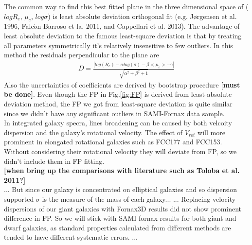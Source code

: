 \documentclass{aa}
\begin{document}
The common way to find this best fitted plane in the three dimensional space of ($logR_e$, $\mu_e$, $log\sigma$) is least absolute deviation orthogonal fit (e.g. J\o rgensen et al. 1996, Falc$\acute{o}$n-Barroso et la. 2011, and Cappellari et al. 2013). The advantage of least absolute deviation to the famous least-square deviation is that by treating all parameters symmetrically it's relatively insensitive to few outliers. In this method the residuals perpendicular to the plane are 
\begin{eqnarray}
	D = \frac{| log(R_e)-\alpha log(\sigma)-\beta <\mu_e>-\gamma |}{\sqrt{\alpha^2+\beta^2+1}}
\end{eqnarray}
Also the uncertainties of coefficients are derived by bootstrap procedure \textbf{[must be done]}. Even though the FP in Fig.\ref{fig:FP} is derived from least-absolute deviation method, the FP we got from least-square deviation is quite similar since we didn't have any significant outliers in SAMI-Fornax data sample.
\\In integrated galaxy specra, lines broadening  can be caused by both velcoity dispersion and the galaxy's rotational velocity. The effect of $V_{rot}$ will more prominent in elongated rotational galaxies such as FCC177 and FCC153. Without considering their rotational velocity they will deviate from FP, so we didn't include them in FP fitting.
\\
\textbf{[when bring up the comparisons with literature such as Toloba et al. 2011?]}\\

... But since our galaxy is concentrated on elliptical galaxies and so dispersion supported $\sigma$ is the measure of the mass of each galaxy...
\cite{Barat2019}
... Replacing velocity dispersions of our giant galaxies with Fornax3D results did not show prominent difference in FP. So we will stick with SAMI-fornax results for both giant and dwarf galaxies, as standard properties calculated from different methods are tended to have different systematic errors. ... 
\end{document}
